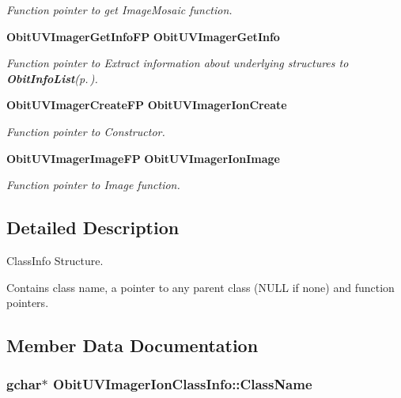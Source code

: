 \begin{CompactItemize}
\begin{CompactList}\small\item\em Function pointer to get Image\-Mosaic function. \item\end{CompactList}\item 
{\bf Obit\-UVImager\-Get\-Info\-FP} {\bf Obit\-UVImager\-Get\-Info}
\begin{CompactList}\small\item\em Function pointer to Extract information about underlying structures to {\bf Obit\-Info\-List}{\rm (p.\,\pageref{structObitInfoList})}. \item\end{CompactList}\item 
{\bf Obit\-UVImager\-Create\-FP} {\bf Obit\-UVImager\-Ion\-Create}
\begin{CompactList}\small\item\em Function pointer to Constructor. \item\end{CompactList}\item 
{\bf Obit\-UVImager\-Image\-FP} {\bf Obit\-UVImager\-Ion\-Image}
\begin{CompactList}\small\item\em Function pointer to Image function. \item\end{CompactList}\end{CompactItemize}


\subsection{Detailed Description}
Class\-Info Structure. 

Contains class name, a pointer to any parent class (NULL if none) and function pointers. 



\subsection{Member Data Documentation}
\subsubsection{\setlength{\rightskip}{0pt plus 5cm}gchar$\ast$ {\bf Obit\-UVImager\-Ion\-Class\-Info::Class\-Name}}\label{structObitUVImagerIonClassInfo_o2}



